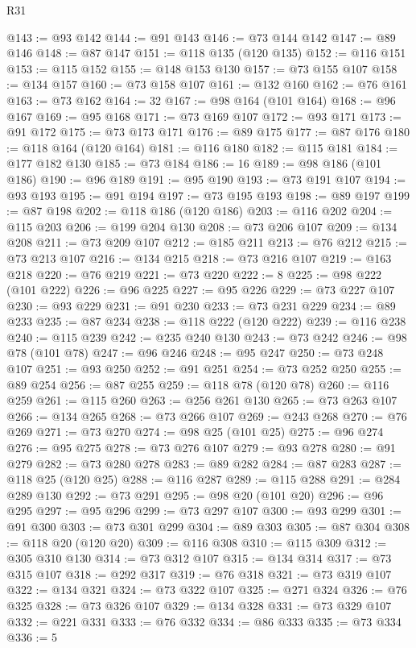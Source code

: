 \begin{lexlean}{R31}
\begin{coremodule}
@143 := @93 @142
@144 := @91 @143
@146 := @73 @144 @142
@147 := @89 @146
@148 := @87 @147
@151 := @118 @135 (@120 @135)
@152 := @116 @151
@153 := @115 @152
@155 := @148 @153 @130
@157 := @73 @155 @107
@158 := @134 @157
@160 := @73 @158 @107
@161 := @132 @160
@162 := @76 @161
@163 := @73 @162
@164 := 32
@167 := @98 @164 (@101 @164)
@168 := @96 @167
@169 := @95 @168
@171 := @73 @169 @107
@172 := @93 @171
@173 := @91 @172
@175 := @73 @173 @171
@176 := @89 @175
@177 := @87 @176
@180 := @118 @164 (@120 @164)
@181 := @116 @180
@182 := @115 @181
@184 := @177 @182 @130
@185 := @73 @184
@186 := 16
@189 := @98 @186 (@101 @186)
@190 := @96 @189
@191 := @95 @190
@193 := @73 @191 @107
@194 := @93 @193
@195 := @91 @194
@197 := @73 @195 @193
@198 := @89 @197
@199 := @87 @198
@202 := @118 @186 (@120 @186)
@203 := @116 @202
@204 := @115 @203
@206 := @199 @204 @130
@208 := @73 @206 @107
@209 := @134 @208
@211 := @73 @209 @107
@212 := @185 @211
@213 := @76 @212
@215 := @73 @213 @107
@216 := @134 @215
@218 := @73 @216 @107
@219 := @163 @218
@220 := @76 @219
@221 := @73 @220
@222 := 8
@225 := @98 @222 (@101 @222)
@226 := @96 @225
@227 := @95 @226
@229 := @73 @227 @107
@230 := @93 @229
@231 := @91 @230
@233 := @73 @231 @229
@234 := @89 @233
@235 := @87 @234
@238 := @118 @222 (@120 @222)
@239 := @116 @238
@240 := @115 @239
@242 := @235 @240 @130
@243 := @73 @242
@246 := @98 @78 (@101 @78)
@247 := @96 @246
@248 := @95 @247
@250 := @73 @248 @107
@251 := @93 @250
@252 := @91 @251
@254 := @73 @252 @250
@255 := @89 @254
@256 := @87 @255
@259 := @118 @78 (@120 @78)
@260 := @116 @259
@261 := @115 @260
@263 := @256 @261 @130
@265 := @73 @263 @107
@266 := @134 @265
@268 := @73 @266 @107
@269 := @243 @268
@270 := @76 @269
@271 := @73 @270
@274 := @98 @25 (@101 @25)
@275 := @96 @274
@276 := @95 @275
@278 := @73 @276 @107
@279 := @93 @278
@280 := @91 @279
@282 := @73 @280 @278
@283 := @89 @282
@284 := @87 @283
@287 := @118 @25 (@120 @25)
@288 := @116 @287
@289 := @115 @288
@291 := @284 @289 @130
@292 := @73 @291
@295 := @98 @20 (@101 @20)
@296 := @96 @295
@297 := @95 @296
@299 := @73 @297 @107
@300 := @93 @299
@301 := @91 @300
@303 := @73 @301 @299
@304 := @89 @303
@305 := @87 @304
@308 := @118 @20 (@120 @20)
@309 := @116 @308
@310 := @115 @309
@312 := @305 @310 @130
@314 := @73 @312 @107
@315 := @134 @314
@317 := @73 @315 @107
@318 := @292 @317
@319 := @76 @318
@321 := @73 @319 @107
@322 := @134 @321
@324 := @73 @322 @107
@325 := @271 @324
@326 := @76 @325
@328 := @73 @326 @107
@329 := @134 @328
@331 := @73 @329 @107
@332 := @221 @331
@333 := @76 @332
@334 := @86 @333
@335 := @73 @334
@336 := 5

\end{coremodule}
\end{lexlean}
